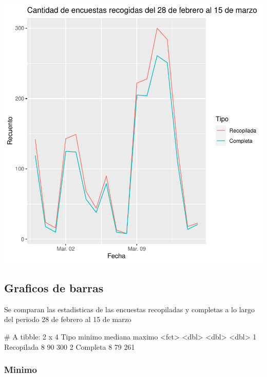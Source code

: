 \documentclass{article}
\begin{document}
\includegraphics{seguimento2-017}

\subsection{Graficos de barras}
Se comparan las estadisticas de las encuestas recopiladas y completas a lo largo del periodo 28 de febrero al 15 de marzo

\begin{Schunk}
\begin{Soutput}
# A tibble: 2 x 4
  Tipo       minimo mediana maximo
  <fct>       <dbl>   <dbl>  <dbl>
1 Recopilada      8      90    300
2 Completa        8      79    261
\end{Soutput}
\end{Schunk}

\subsubsection{Minimo}
\end{document}
